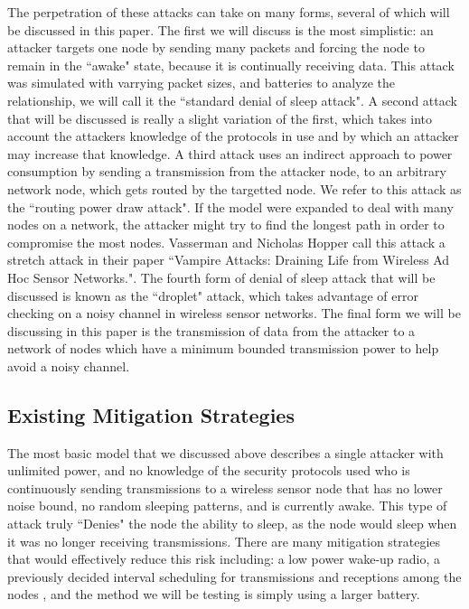 The perpetration of these attacks can take on many forms, several of which will be discussed in this paper. The first we will discuss is the most simplistic: an attacker targets one node by sending many packets and forcing the
node to remain in the ``awake" state, because it is continually receiving data. This attack was simulated with varrying packet sizes, and batteries to analyze the relationship, we will call it the ``standard denial of sleep attack". A second attack that will be discussed is really a 
slight variation of the first, which takes into account the attackers knowledge of the protocols in use and by which an attacker may increase that knowledge\cite{4476299}. A third attack uses an indirect approach to power 
consumption by sending a transmission from the attacker node, to an arbitrary network node, which gets routed by the targetted node. We refer to this attack as the ``routing power draw attack". If the model were expanded to deal with many nodes on a network, the attacker might try to 
find the longest path in order to compromise the most nodes. Vasserman and Nicholas Hopper call this attack a stretch attack in their paper ``Vampire Attacks: Draining Life from Wireless Ad Hoc Sensor Networks."\cite{6112758}. 
The fourth form of denial of sleep attack that will be discussed is known as the ``droplet" attack, which takes advantage of error checking on a noisy channel in wireless sensor networks\cite{6680296}. The final form we will be 
discussing in this paper is the transmission of data from the attacker to a network of nodes which have a minimum bounded transmission power to help avoid a noisy channel.  

\subsection{Existing Mitigation Strategies}

The most basic model that we discussed above describes a single attacker with unlimited power, and no knowledge of the security protocols used who is continuously sending transmissions to a wireless sensor node that has no lower 
noise bound, no random sleeping patterns, and is currently awake. This type of attack truly ``Denies" the node the ability to sleep, as the node would sleep when it was no longer receiving transmissions. There are many mitigation
strategies that would effectively reduce this risk including: a low power wake-up radio\cite{5211020}, a previously decided interval scheduling for transmissions and receptions among the nodes \cite{4476299}, and the method we will be testing
is simply using a larger battery.

